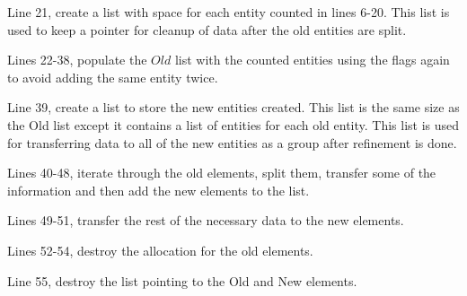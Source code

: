 \documentclass{article}
\begin{document}
Line 21, create a list with space for each entity counted in lines 6-20. This list is used to keep a pointer for cleanup of data after the old entities are split. 

Lines 22-38, populate the $Old$ list with the counted entities using the flags again to avoid adding the same entity twice. 

Line 39, create a list to store the new entities created. This list is the same size as the Old list except it contains a list of entities for each old entity. This list is used for transferring data to all of the new entities as a group after refinement is done. 

Lines 40-48, iterate through the old elements, split them, transfer some of the information and then add the new elements to the list. 

Lines 49-51, transfer the rest of the necessary data to the new elements. 

Lines 52-54, destroy the allocation for the old elements. 

Line 55, destroy the list pointing to the Old and New elements.
\end{document}
